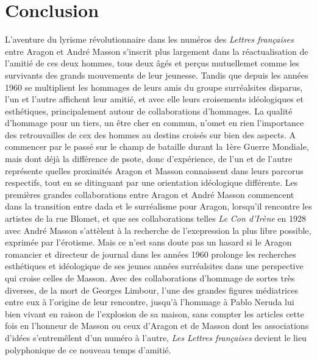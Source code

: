 \chapter*{Conclusion} 

L'aventure du lyrisme révolutionnaire dans les numéros des \emph{Lettres françaises} entre Aragon et André Masson s'inscrit plus largement dans la réactualisation de l'amitié de ces deux hommes, tous deux âgés et perçus mutuellemet comme les survivants des grands mouvements de leur jeunesse. Tandis que depuis les années 1960 se multiplient les hommages de leurs amis du groupe surréalsites disparus, l'un et l'autre affichent leur amitié, et avec elle leurs croisements idéologiques et esthétiques, principalement autour de collaborations d'hommages. La qualité d'hommage pour un tiers, un être cher en commun, n'omet en rien l'importance des retrouvailles de cex des hommes au destins croisés sur bien des aspects. A commencer par le passé sur le champ de bataille durant la 1ère Guerre Mondiale, mais dont déjà la différence de psote, donc d'expérience, de l'un et de l'autre représente quelles proximités Aragon et Masson connaissent dans leurs parcorus respectifs, tout en se ditinguant par une orientation idéologique différente. Les premières grandes collaborations entre Aragon et André Masson commencent dans la transition entre dada et le surréalisme pour Aragon, lorsqu'il rencontre les artistes de la rue Blomet, et que ses collaborations telles \emph{Le Con d'Irène  } en 1928 avec André Masson s'attèlent à la recherche de l'exepression la plus libre possible, exprimée par l'érotisme. Mais ce n'est sans doute pas un hasard si le Aragon romancier et directeur de journal dans les années 1960 prolonge les recherches esthétiques et idéologique de ses jeunes années surréalsites dans une perspective qui croise celles de Masson. Avec des collaborations d'hommage de sortes très diverses, de la mort de Georges Limbour, l'une des grandes figures médiatrices entre eux à l'origine de leur rencontre, jusqu'à l'hommage à Pablo Neruda lui bien vivant en raison de l'explosion de sa maison, sans compter les articles cette fois en l'honneur de Masson ou ceux d'Aragon et de Masson dont les associations d'idées s'entremêlent d'un numéro à l'autre, \emph{Les Lettres françaises} devient le lieu polyphonique de ce nouveau temps d'amitié. 

